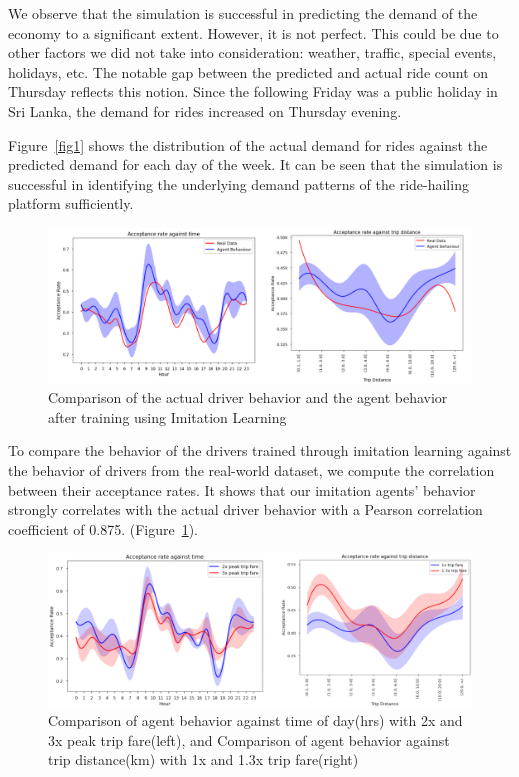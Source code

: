 \documentclass[runningheads]{llncs}
\begin{document}
We observe that the simulation is successful in predicting the demand of the economy to a significant extent. However, it is not perfect. This could be due to other factors we did not take into consideration: weather, traffic, special events, holidays, etc. The notable gap between the predicted and actual ride count on Thursday reflects this notion. Since the following Friday was a public holiday in Sri Lanka, the demand for rides increased on Thursday evening.

Figure~\ref{fig1} shows the distribution of the actual demand for rides against the predicted demand for each day of the week. It can be seen that the simulation is successful in identifying the underlying demand patterns of the ride-hailing platform sufficiently. 

\begin{figure}[h!]
\centering
\includegraphics[width=0.97\columnwidth]{IL.png} \caption{Comparison of the actual driver behavior and the agent behavior after training using Imitation Learning}
\label{IL}
\end{figure}

To compare the behavior of the drivers trained through imitation learning against the behavior of drivers from the real-world dataset, we compute the correlation between their acceptance rates. It shows that our imitation agents' behavior strongly correlates with the actual driver behavior with a Pearson correlation coefficient of 0.875. (Figure~\ref{IL}).  

\begin{figure}[h!]
\centering
\includegraphics[width=0.97\columnwidth]{il-rl1.png} \caption{Comparison of agent behavior against time of day(hrs) with 2x and 3x peak trip fare(left), and Comparison of agent behavior against trip distance(km) with 1x and 1.3x trip fare(right)}
\label{figil1}
\end{figure}
\end{document}
